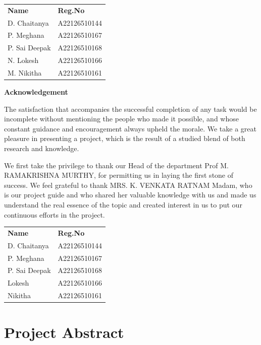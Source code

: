 \documentclass[12pt,a4paper]{report}
\begin{document}
\vspace{2cm}
\begin{tabular}{ll}
\textbf{Name} & \textbf{Reg.No} \\
D. Chaitanya & A22126510144 \\
P. Meghana & A22126510167 \\
P. Sai Deepak & A22126510168 \\
N. Lokesh & A22126510166 \\
M. Nikitha & A22126510161 \\
\end{tabular}
\newpage

\thispagestyle{empty}
\begin{center}
    \Large\textbf{Acknowledgement}
\end{center}
\vspace{1cm}

The satisfaction that accompanies the successful completion of any task would
be incomplete without mentioning the people who made it possible, and whose
constant guidance and encouragement always upheld the morale. We take a great
pleasure in presenting a project, which is the result of a studied blend of
both research and knowledge.

We first take the privilege to thank our Head of the department Prof M.
RAMAKRISHNA MURTHY, for permitting us in laying the first stone of success. We
feel grateful to thank MRS. K. VENKATA RATNAM Madam, who is our project guide
and who shared her valuable knowledge with us and made us understand the real
essence of the topic and created interest in us to put our continuous efforts
in the project.

\vspace{2cm}
\begin{tabular}{ll}
\textbf{Name} & \textbf{Reg.No} \\
D. Chaitanya & A22126510144 \\
P. Meghana & A22126510167 \\
P. Sai Deepak & A22126510168 \\
Lokesh & A22126510166 \\
Nikitha & A22126510161 \\
\end{tabular}
\newpage

\tableofcontents
\newpage

\chapter{Project Abstract}
\end{document}
